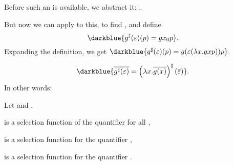 \documentclass%
[%
Screen4to3,
]{foils}
\begin{document}
Before such an  is available, we abstract it: 
.

But now we can apply \darkblue{$\varepsilon$} to this, to find
, and define
\[
\darkblue{g^\sharp(\varepsilon)(p) = g x_0 p}.
\]
Expanding the definition, we get $\darkblue{g^\sharp(\varepsilon)(p) = g (\varepsilon(\lambda x.g x p)) p}$.



\[
\darkblue{\overline{g^\sharp(\varepsilon)} = \left(\lambda x.\overline{g(x)}\right)^\sharp(\overline{\varepsilon})}.
\]
In other words:

\vfill

Let  and . 

  is a selection function of the
quantifier  for all ,

  is a selection
function for the quantifier ,

  is a
selection function for the quantifier .
\end{document}
